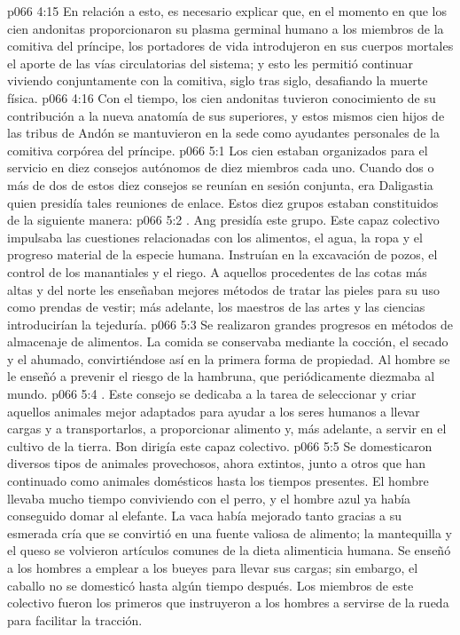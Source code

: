 \vs p066 4:15 \pc En relación a esto, es necesario explicar que, en el momento en que los cien andonitas proporcionaron su plasma germinal humano a los miembros de la comitiva del príncipe, los portadores de vida introdujeron en sus cuerpos mortales el aporte de las vías circulatorias del sistema; y esto les permitió continuar viviendo conjuntamente con la comitiva, siglo tras siglo, desafiando la muerte física.
\vs p066 4:16 Con el tiempo, los cien andonitas tuvieron conocimiento de su contribución a la nueva anatomía de sus superiores, y estos mismos cien hijos de las tribus de Andón se mantuvieron en la sede como ayudantes personales de la comitiva corpórea del príncipe.
\vs p066 5:1 Los cien estaban organizados para el servicio en diez consejos autónomos de diez miembros cada uno. Cuando dos o más de dos de estos diez consejos se reunían en sesión conjunta, era Daligastia quien presidía tales reuniones de enlace. Estos diez grupos estaban constituidos de la siguiente manera:
\vs p066 5:2 . Ang presidía este grupo. Este capaz colectivo impulsaba las cuestiones relacionadas con los alimentos, el agua, la ropa y el progreso material de la especie humana. Instruían en la excavación de pozos, el control de los manantiales y el riego. A aquellos procedentes de las cotas más altas y del norte les enseñaban mejores métodos de tratar las pieles para su uso como prendas de vestir; más adelante, los maestros de las artes y las ciencias introducirían la tejeduría.
\vs p066 5:3 Se realizaron grandes progresos en métodos de almacenaje de alimentos. La comida se conservaba mediante la cocción, el secado y el ahumado, convirtiéndose así en la primera forma de propiedad. Al hombre se le enseñó a prevenir el riesgo de la hambruna, que periódicamente diezmaba al mundo.
\vs p066 5:4 . Este consejo se dedicaba a la tarea de seleccionar y criar aquellos animales mejor adaptados para ayudar a los seres humanos a llevar cargas y a transportarlos, a proporcionar alimento y, más adelante, a servir en el cultivo de la tierra. Bon dirigía este capaz colectivo.
\vs p066 5:5 Se domesticaron diversos tipos de animales provechosos, ahora extintos, junto a otros que han continuado como animales domésticos hasta los tiempos presentes. El hombre llevaba mucho tiempo conviviendo con el perro, y el hombre azul ya había conseguido domar al elefante. La vaca había mejorado tanto gracias a su esmerada cría que se convirtió en una fuente valiosa de alimento; la mantequilla y el queso se volvieron artículos comunes de la dieta alimenticia humana. Se enseñó a los hombres a emplear a los bueyes para llevar sus cargas; sin embargo, el caballo no se domesticó hasta algún tiempo después. Los miembros de este colectivo fueron los primeros que instruyeron a los hombres a servirse de la rueda para facilitar la tracción.
